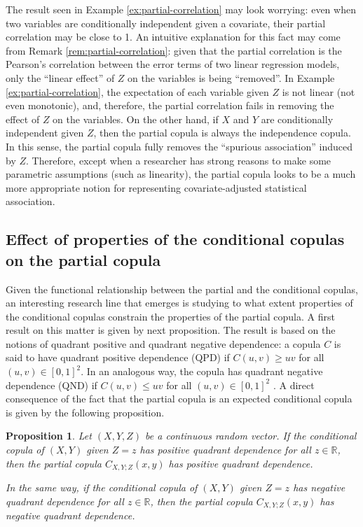 \documentclass[
]{article}
\newtheorem{proposition}{Proposition}
\begin{document}
The result seen in Example \ref{ex:partial-correlation} may look
worrying: even when two variables are conditionally independent given a
covariate, their partial correlation may be close to 1. An intuitive
explanation for this fact may come from Remark
\ref{rem:partial-correlation}: given that the partial correlation is the
Pearson's correlation between the error terms of two linear regression
models, only the ``linear effect'' of \(Z\) on the variables is being
``removed''. In Example \ref{ex:partial-correlation}, the expectation of
each variable given \(Z\) is not linear (not even monotonic), and,
therefore, the partial correlation fails in removing the effect of \(Z\)
on the variables. On the other hand, if \(X\) and \(Y\) are
conditionally independent given \(Z\), then the partial copula is always
the independence copula. In this sense, the partial copula fully removes
the ``spurious association'' induced by \(Z\). Therefore, except when a
researcher has strong reasons to make some parametric assumptions (such
as linearity), the partial copula looks to be a much more appropriate
notion for representing covariate-adjusted statistical association.

\subsection{Effect of properties of the conditional copulas on the
partial
copula}\label{effect-of-properties-of-the-conditional-copulas-on-the-partial-copula}

Given the functional relationship between the partial and the
conditional copulas, an interesting research line that emerges is
studying to what extent properties of the conditional copulas constrain
the properties of the partial copula. A first result on this matter is
given by next proposition. The result is based on the notions of
quadrant positive and quadrant negative dependence: a copula \(C\) is
said to have quadrant positive dependence (QPD) if \(C(u, v) \geq uv\)
for all \((u, v) \in [0,1]^2\). In an analogous way, the copula has
quadrant negative dependence (QND) if \(C(u, v) \leq uv\) for all
\((u, v) \in [0,1]^2\) \citep{joe2014}. A direct consequence of the fact
that the partial copula is an expected conditional copula is given by
the following proposition.

\begin{proposition}\label{prop:quadrant-dependence}
Let $(X, Y, Z)$ be a continuous random vector. If the conditional copula of $(X, Y)$ given $Z = z$ has positive quadrant dependence for all $z \in \mathbb{R}$, then the partial copula $C_{X,Y;Z}(x, y)$ has positive quadrant dependence.

In the same way, if the conditional copula of $(X, Y)$ given $Z = z$ has negative quadrant dependence for all $z \in \mathbb{R}$, then the partial copula $C_{X,Y;Z}(x, y)$ has negative quadrant dependence.
\end{proposition}
\end{document}
